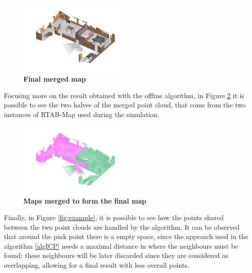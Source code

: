 \begin{figure}[H]
  \begin{center}
    \includegraphics[width=0.49\textwidth]{img/merged.png}
  \end{center}
  \caption[]{
    \textbf{Final merged map} 
  }
  \label{fig:merged}
\end{figure}

Focusing more on the result obtained with the offline algorithm, in Figure \ref{fig:split} it is possible to see the two halves of the merged point cloud, that come from the two instances of RTAB-Map used during the simulation. 

\begin{figure}[H]
  \begin{center}
    \includegraphics[width=0.49\textwidth]{img/split.png}
  \end{center}
  \caption[]{
    \textbf{Maps merged to form the final map} 
  }
  \label{fig:split}
\end{figure}

Finally, in Figure \ref{fig:example}, it is possible to see how the points shared between the two point clouds are handled by the algorithm. It can be observed that around the pink point there is a empty space, since the approach used in the algorithm \ref{algICP} needs a maximal distance in where the neighbours must be found: these neighbours will be later discarded since they are considered as overlapping, allowing for a final result with less overall points.




